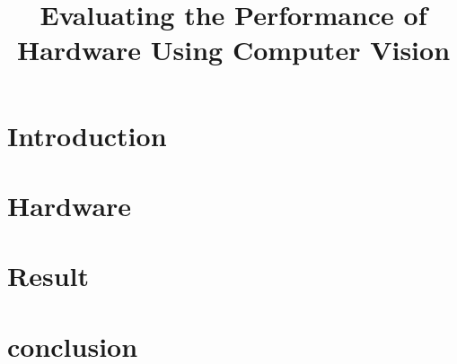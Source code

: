 \documentclass[12pt,journal]{IEEEtran}
\begin{document}



\newpage
\cleardoublepage



\newpage
\setcounter{page}{1}
\title{Evaluating the Performance of Hardware Using Computer Vision}
\maketitle



\begin{abstract}
  
\end{abstract}






\section{Introduction}


\section{Hardware}


\section{Result}


\section{conclusion}




\newpage
\printbibliography
\newpage

\onecolumn
\end{document}
